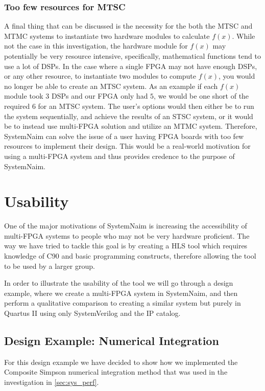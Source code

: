 \subsubsection{Too few resources for MTSC}

A final thing that can be discussed is the necessity for the both the MTSC and MTMC systems to instantiate two hardware modules to calculate $f(x)$. While not the case in this investigation, the hardware module for $f(x)$ may potentially be very resource intensive, specifically, mathematical functions tend to use a lot of DSPs. In the case where a single FPGA may not have enough DSPs, or any other resource, to instantiate two modules to compute $f(x)$, you would no longer be able to create an MTSC system. As an example if each $f(x)$ module took 3 DSPs and our FPGA only had $5$, we would be one short of the required $6$ for an MTSC system. The user's options would then either be to run the system sequentially, and achieve the results of an STSC system, or it would be to instead use multi-FPGA solution and utilize an MTMC system. Therefore, SystemNaim can solve the issue of a user having FPGA boards with too few resources to implement their design. This would be a real-world motivation for using a multi-FPGA system and thus provides credence to the purpose of SystemNaim.

\section{Usability}
\label{sec:usability}

One of the major motivations of SystemNaim is increasing the accessibility of multi-FPGA systems to people who may not be very hardware proficient. The way we have tried to tackle this goal is by creating a HLS tool which requires knowledge of C90 and basic programming constructs, therefore allowing the tool to be used by a larger group. 

In order to illustrate the usability of the tool we will go through a design example, where we create a multi-FPGA system in SystemNaim,  and then perform a qualitative comparison to creating a similar system but purely in Quartus II using only SystemVerilog and the IP catalog.

\subsection{Design Example: Numerical Integration}
\label{sec:design_example}


For this design example we have decided to show how we implemented the Composite Simpson numerical integration method that was used in the investigation in \autoref{sec:sys_perf}.


